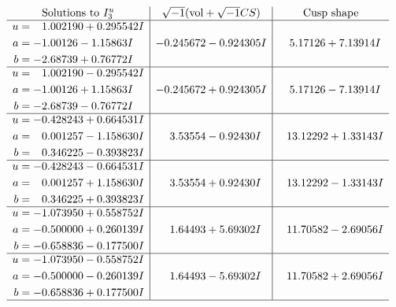 \documentclass[1p]{elsarticle_modified}
\theoremstyle{definition}
\newcommand{\I}{\sqrt{-1}}
\begin{document}
$$\begin{array}{c|c|c}  
\text{Solutions to }I^u_{3}& \I (\text{vol} + \sqrt{-1}CS) & \text{Cusp shape}\\
 \hline 
\begin{aligned}
u &= \phantom{-}1.002190 + 0.295542 I \\
a &= -1.00126 - 1.15863 I \\
b &= -2.68739 + 0.76772 I\end{aligned}
 & -0.245672 - 0.924305 I & \phantom{-}5.17126 + 7.13914 I \\ \hline\begin{aligned}
u &= \phantom{-}1.002190 - 0.295542 I \\
a &= -1.00126 + 1.15863 I \\
b &= -2.68739 - 0.76772 I\end{aligned}
 & -0.245672 + 0.924305 I & \phantom{-}5.17126 - 7.13914 I \\ \hline\begin{aligned}
u &= -0.428243 + 0.664531 I \\
a &= \phantom{-}0.001257 - 1.158630 I \\
b &= \phantom{-}0.346225 - 0.393823 I\end{aligned}
 & \phantom{-}3.53554 - 0.92430 I & \phantom{-}13.12292 + 1.33143 I \\ \hline\begin{aligned}
u &= -0.428243 - 0.664531 I \\
a &= \phantom{-}0.001257 + 1.158630 I \\
b &= \phantom{-}0.346225 + 0.393823 I\end{aligned}
 & \phantom{-}3.53554 + 0.92430 I & \phantom{-}13.12292 - 1.33143 I \\ \hline\begin{aligned}
u &= -1.073950 + 0.558752 I \\
a &= -0.500000 + 0.260139 I \\
b &= -0.658836 - 0.177500 I\end{aligned}
 & \phantom{-}1.64493 + 5.69302 I & \phantom{-}11.70582 - 2.69056 I \\ \hline\begin{aligned}
u &= -1.073950 - 0.558752 I \\
a &= -0.500000 - 0.260139 I \\
b &= -0.658836 + 0.177500 I\end{aligned}
 & \phantom{-}1.64493 - 5.69302 I & \phantom{-}11.70582 + 2.69056 I\\
 \hline 
 \end{array}$$\newpage
\end{document}
